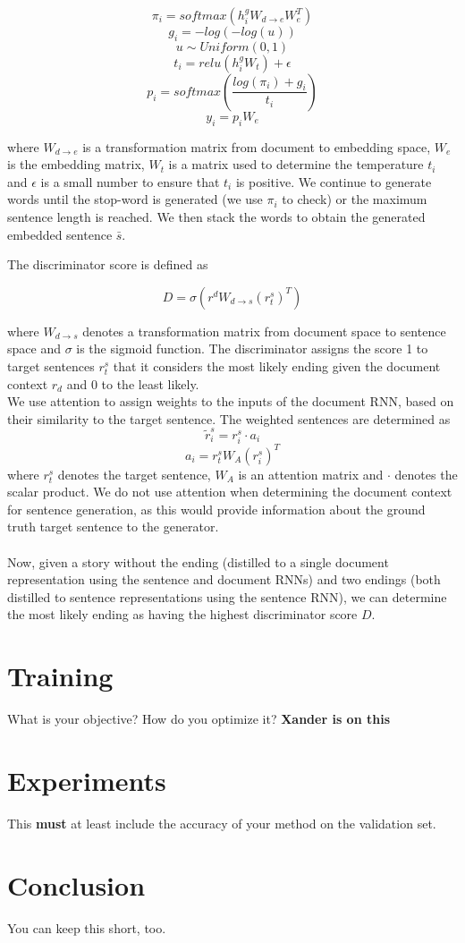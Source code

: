 \documentclass{article}
\begin{document}
$$ \pi_{i} = softmax(h^{g}_{i}W_{d \rightarrow e}W_{e}^{T})$$
$$ g_{i} = -log(-log(u)) $$
$$ u \sim Uniform(0,1) $$
$$ t_{i} = relu(h^{g}_{i}W_{t}) + \epsilon $$
$$ p_{i} = softmax(\frac{log(\pi_{i}) + g_{i}}{t_{i}}) $$
$$ y_{i} = p_{i}W_{e}$$

where $W_{d \rightarrow e}$ is a transformation matrix from document to embedding space, $W_{e}$ is the embedding matrix, $W_{t}$ is a matrix used to determine the temperature $t_{i}$ and $\epsilon$ is a small number to ensure that $t_{i}$ is positive. We continue to generate words until the stop-word is generated (we use $\pi_{i}$ to check) or the maximum sentence length is reached. We then stack the words to obtain the generated embedded sentence $\bar{s}$.

The discriminator score is defined as 

$$ D = \sigma(r^{d}W_{d \rightarrow s}(r^{s}_{t})^{T} )$$

where $W_{d \rightarrow s}$ denotes a transformation matrix from document space to sentence space and $\sigma$ is the sigmoid function. The discriminator assigns the score 1 to target sentences $r^{s}_{t}$ that it considers the most likely ending given the document context $r_{d}$ and 0 to the least likely. \\
We use attention to assign weights to the inputs of the document RNN, based on their similarity to the target sentence. The weighted sentences are determined as
$$ \tilde{r}^{s}_{i} = r^{s}_{i} \cdot a_{i} $$
$$ a_{i} = r^{s}_{t}W_{A}(r^{s}_{i})^{T} $$
where $r^{s}_{t}$ denotes the target sentence, $W_{A}$ is an attention matrix and $\cdot$ denotes the scalar product. We do not use attention when determining the document context for sentence generation, as this would provide information about the ground truth target sentence to the generator.\\ \\
Now, given a story without the ending (distilled to a single document representation using the sentence and document RNNs) and two endings (both distilled to sentence representations using the sentence RNN), we can determine the most likely ending as having the highest discriminator score $D$. 

\section{Training}
What is your objective? How do you optimize it?
\textbf{Xander is on this}
\section{Experiments}
This {\bf must} at least include the accuracy of your method on the validation set.
\section{Conclusion}
You can keep this short, too.
\end{document}
